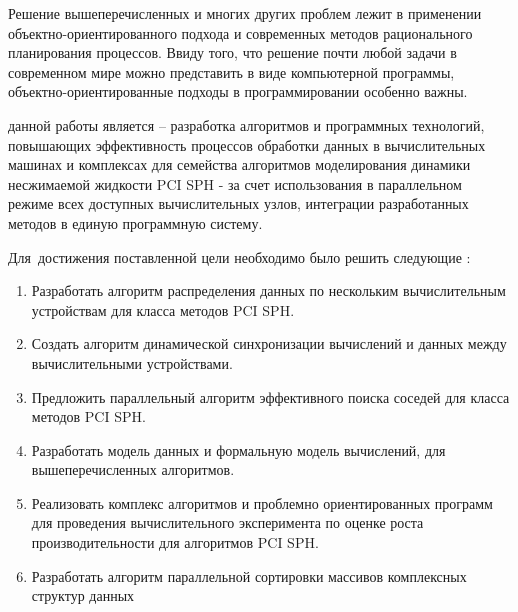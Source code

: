 Решение вышеперечисленных и многих других проблем лежит в применении объектно-ориентированного подхода и современных методов рационального планирования процессов. Ввиду того, что решение почти любой задачи в современном мире можно представить в виде компьютерной программы, объектно-ориентированные подходы в программировании особенно важны.



{\aim} данной работы является – разработка алгоритмов и программных технологий,  повышающих эффективность процессов обработки данных в вычислительных машинах и комплексах для семейства алгоритмов моделирования динамики несжимаемой жидкости PCI SPH - за счет использования в параллельном режиме  всех доступных вычислительных узлов,  интеграции разработанных методов в единую программную систему.

Для~достижения поставленной цели необходимо было решить следующие {\tasks}:
\begin{enumerate}
  \item Разработать алгоритм распределения данных по нескольким вычислительным устройствам для класса методов PCI SPH.
  \item Создать алгоритм динамической синхронизации вычислений и данных между вычислительными устройствами.
  \item Предложить параллельный  алгоритм эффективного поиска соседей для класса методов PCI SPH.
  \item Разработать модель данных и формальную модель  вычислений, для вышеперечисленных алгоритмов.
  \item Реализовать комплекс алгоритмов и проблемно ориентированных программ для проведения вычислительного эксперимента по оценке роста производительности для алгоритмов PCI SPH.
  \item Разработать алгоритм параллельной сортировки массивов комплексных структур данных
\end{enumerate}

